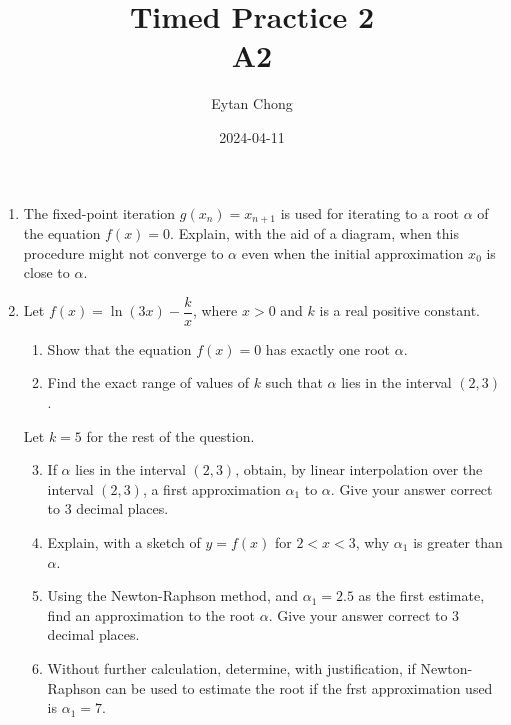 \documentclass{echw}
\title{Timed Practice 2\\A2}
\author{Eytan Chong}
\date{2024-04-11}
\begin{document}
    \problem{}
        \begin{enumerate}
            \item The fixed-point iteration $g(x_n) = x_{n+1}$ is used for iterating to a root $\alpha$ of the equation $f(x) = 0$. Explain, with the aid of a diagram, when this procedure might not converge to $\alpha$ even when the initial approximation $x_0$ is close to $\alpha$.
            \item Let $f(x) = \ln (3x) - \dfrac{k}{x}$, where $x > 0$ and $k$ is a real positive constant.
            \begin{enumerate}
                \item Show that the equation $f(x) = 0$ has exactly one root $\alpha$.
                \item Find the exact range of values of $k$ such that $\alpha$ lies in the interval $(2, 3)$.
            \end{enumerate}

            Let $k = 5$ for the rest of the question.

            \begin{enumerate}
                \setcounter{enumii}{2}
                \item If $\alpha$ lies in the interval $(2, 3)$, obtain, by linear interpolation over the interval $(2, 3)$, a first approximation $\alpha_1$ to $\alpha$. Give your answer correct to 3 decimal places.
                \item Explain, with a sketch of $y = f(x)$ for $2 < x < 3$, why $\alpha_1$ is greater than $\alpha$.
                \item Using the Newton-Raphson method, and $\alpha_1 = 2.5$ as the first estimate, find an approximation to the root $\alpha$. Give your answer correct to 3 decimal places.
                \item Without further calculation, determine, with justification, if Newton-Raphson can be used to estimate the root if the frst approximation used is $\alpha_1 = 7$.
            \end{enumerate}
        \end{enumerate}

    \solution
\end{document}
